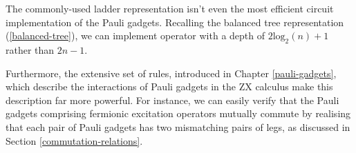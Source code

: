 
The commonly-used ladder representation isn't even the most efficient circuit implementation of the Pauli gadgets. Recalling the balanced tree representation (\ref{balanced-tree}), we can implement operator with a depth of $2\text{log}_2(n) + 1$ rather than $2n - 1$.


Furthermore, the extensive set of rules, introduced in Chapter \ref{pauli-gadgets}, which describe the interactions of Pauli gadgets in the ZX calculus make this description far more powerful. For instance, we can easily verify that the Pauli gadgets comprising fermionic excitation operators mutually commute by realising that each pair of Pauli gadgets has two mismatching pairs of legs, as discussed in Section \ref{commutation-relations}.
